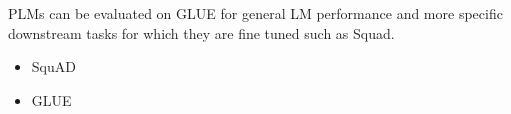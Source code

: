 \documentclass{article}
\begin{document}
%
PLMs can be evaluated on GLUE for general LM performance and more specific downstream
tasks for which they are fine tuned such as Squad.
\begin{itemize}
  \item SquAD\cite{squad}
  \item GLUE\cite{glue}
\end{itemize}


\medskip

\end{document}
